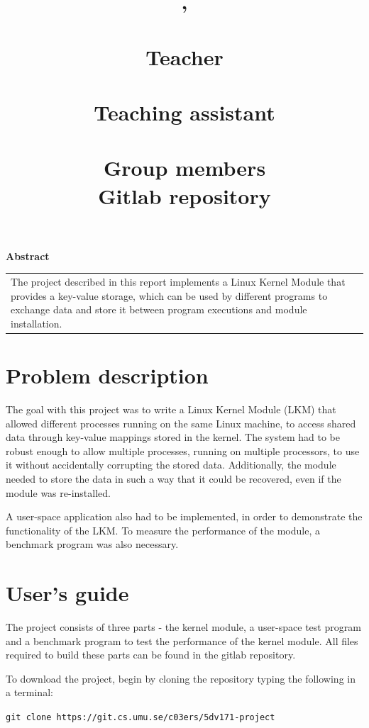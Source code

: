 \documentclass[final,a4paper]{article}
\title{
  \pagenumbering{gobble}
  \begin{center}
  {\LARGE \bf \course{}, \semester}\\
  {\Large \bf \assignment}\\
  \vspace{6em}
  {\normalsize
  {\bf Teacher}\\
  {\lecturer}\vspace{1em}\\
  {\bf Teaching assistant}\\
  {\assistants}\vspace{1em}\\
  {\bf Group members}\\
  \authors
  {\bf Gitlab repository}\vspace{-1em}\\
  {\codebase}}
  \end{center}
  \vspace{3em}
}
\author{}
\date{}
\newcommand{\codebase}{https://git.cs.umu.se/c03ers/5dv171-project}
\begin{document}
\maketitle
  \begin{center}
  {\bf Abstract }\\
  \vspace{0.5em}
  \begin{tabular}{ p{25em} }
  \hline
  \vspace{0.0em}
  The project described in this report implements a Linux Kernel Module
  that provides a key-value storage, which can be used by different programs
  to exchange data and store it between program executions and module
  installation.\vspace{0.7em}\\
  \end{tabular}
  \end{center}
\pagebreak
\tableofcontents
\newpage
{}
\section{Problem description}
The goal with this project was to write a Linux Kernel Module (LKM) that allowed
different processes running on the same Linux machine, to access shared data
through key-value mappings stored in the kernel. The system had to be robust
enough to allow multiple processes, running on multiple processors, to use it
without accidentally corrupting the stored data. Additionally, the module
needed to store the data in such a way that it could be recovered, even if the
module was re-installed.

A user-space application also had to be implemented, in order  to demonstrate
the functionality of the LKM. To measure the performance of the module, a
benchmark program was also necessary.

\section{User's guide}
The project consists of three parts - the kernel module, a user-space
test program and a benchmark program to test the performance of the kernel
module. All files required to build these parts can be found in the gitlab
repository.

To download the project, begin by cloning the repository typing the following in
a terminal:
\begin{center}
{\tt git clone \codebase}
\end{center}
\end{document}
